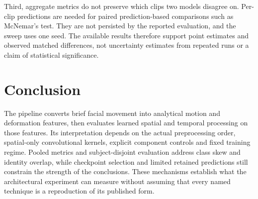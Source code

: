 Third, aggregate metrics do not preserve which clips two models disagree on. Per-clip predictions are needed for paired prediction-based comparisons such as McNemar's test. They are not persisted by the reported evaluation, and the sweep uses one seed. The available results therefore support point estimates and observed matched differences, not uncertainty estimates from repeated runs or a claim of statistical significance.

\section{Conclusion}
\label{sec:ch2-conclusion}

The pipeline converts brief facial movement into analytical motion and deformation features, then evaluates learned spatial and temporal processing on those features. Its interpretation depends on the actual preprocessing order, spatial-only convolutional kernels, explicit component controls and fixed training regime. Pooled metrics and subject-disjoint evaluation address class skew and identity overlap, while checkpoint selection and limited retained predictions still constrain the strength of the conclusions. These mechanisms establish what the architectural experiment can measure without assuming that every named technique is a reproduction of its published form.
